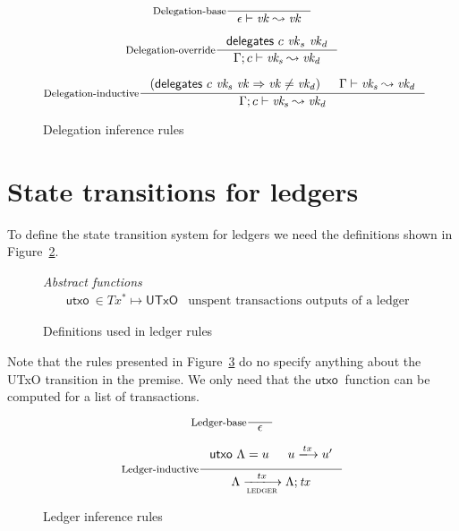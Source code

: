 \documentclass[11pt,a4paper]{article}
\newcommand{\var}[1]{\mathit{#1}}
\newcommand{\fun}[1]{\mathsf{#1}}
\newcommand{\type}[1]{\mathsf{#1}}
\newcommand{\trans}[2]{\xlongrightarrow[\textsc{#1}]{#2}}
\newcommand{\seqof}[1]{#1^{*}}
\newcommand{\ldelegates}[3]{#1 \vdash #2 \leadsto #3}
\newcommand{\UTxO}{\type{UTxO}}
\newcommand{\utxo}[1]{\fun{utxo}\ #1}
\newcommand{\delegatesName}{\fun{delegates}}
\newcommand{\delegates}[3]{\delegatesName~#1~#2~#3}
\begin{document}
\begin{figure}[h]

  \begin{equation}\label{eq:delegation-base}
    \inference[Delegation-base]
    {}
    {\ldelegates{\epsilon}{\var{vk}}{\var{vk}}}
  \end{equation}
  
  \begin{equation}\label{eq:delegation-override}
    \inference[Delegation-override]
    {\delegates{c}{\var{vk}_s}{\var{vk}_d}}
    {\ldelegates{\Gamma; c}{\var{vk_s}}{\var{vk_d}}}
  \end{equation}

  \begin{equation}\label{eq:delegation-inductive}
    \inference[Delegation-inductive]
    {(\delegates{c}{\var{vk_s}}{\var{vk}} \Rightarrow \var{vk} \neq \var{vk_d})
      & \ldelegates{\Gamma}{\var{vk_s}}{\var{vk_d}}
    }
    {\ldelegates{\Gamma; c}{\var{vk_s}}{\var{vk_d}}}
  \end{equation}

  \caption{Delegation inference rules}
  \label{fig:state-trans-delegation}
\end{figure}
\section{State transitions for ledgers}
\label{sec:state-trans-ledg}

To define the state transition system for ledgers we need the definitions
shown in Figure~\ref{fig:ledger-rules-defs}.

\begin{figure}[h]
  \emph{Abstract functions}
  \begin{align*}
    & \utxo{} \in \seqof{Tx} \mapsto \UTxO
      & \text{unspent transactions outputs of a ledger}
  \end{align*}
  \caption{Definitions used in ledger rules}
  \label{fig:ledger-rules-defs}
\end{figure}

Note that the rules presented in Figure~\ref{fig:ledger-rules} do no specify
anything about the UTxO transition in the premise. We only need that the
$\utxo{}$ function can be computed for a list of transactions.

\begin{figure}[h]
  \begin{equation}
    \label{eq:ledger-base}
    \inference[Ledger-base]
    {}
    {\epsilon}
  \end{equation}

  \begin{equation}
    \label{eq:ledger-indutive}
    \inference[Ledger-inductive]
    {\utxo{\Lambda} = u & u \trans{}{tx} u' }
    {\Lambda \trans{ledger}{tx}{\Lambda; \var{tx}}}
  \end{equation}
  \caption{Ledger inference rules}
  \label{fig:ledger-rules}
\end{figure}
\end{document}

